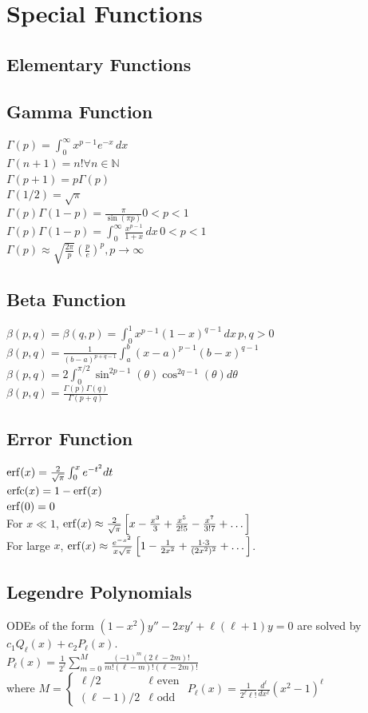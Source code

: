 \documentclass[10pt,landscape,letterpaper]{cheatsheet}
\DeclareMathOperator{\erfc}{erfc}
\begin{document}
\section{Special Functions}
\subsection{Elementary Functions}
\subsection{Gamma Function}
$\Gamma(p)=\int_{0}^{\infty}x^{p-1}e^{-x}\,dx$\\
$\Gamma(n+1)=n!\forall n\in\mathbb{N}$\\
$\Gamma(p+1)=p\Gamma(p)$\\
$\Gamma(1/2)=\sqrt{\pi}$\\
$\Gamma(p)\Gamma(1-p)=\frac{\pi}{\sin(\pi p)}0<p<1$\\
$\Gamma(p)\Gamma(1-p)=\int_{0}^{\infty}\frac{x^{p-1}}{1+x}\,dx\,0<p<1$\\
$\Gamma(p)\approx\sqrt{\frac{2\pi}{p}}\left(\frac{p}{e}\right)^p,p\to\infty$
\subsection{Beta Function}
$\beta(p,q)=\beta(q,p)=\int_{0}^{1}x^{p-1}(1-x)^{q-1}\,dx\,p,q>0$\\
$\beta(p,q)=\frac{1}{({b-a})^{p+q-1}}\int_{a}^{b}(x-a)^{p-1}(b-x)^{q-1}$\\
$\beta(p,q)=2\int_{0}^{\pi/2}\sin^{2p-1}(\theta)\cos^{2q-1}(\theta)d\theta$\\
$\beta(p,q)=\frac{\Gamma(p)\Gamma(q)}{\Gamma(p+q)}$
\subsection{Error Function}
$\erf(x)=\frac{2}{\sqrt{\pi}}\int_{0}^{x}e^{-t^2}dt$\\
$\erfc(x)=1-\erf(x)$\\
$\erf(0)=0$\\
For $x\ll 1$, $\erf(x)\approx \frac{2}{\sqrt{\pi}}\left[x-\frac{x^3}{3}+\frac{x^5}{2!5}-\frac{x^7}{3!7}+\dots\right]$\\
For large $x$,
$\erf(x)\approx\frac{e^{-x^2}}{x\sqrt{\pi}}\left[1-\frac{1}{2x^2}+\frac{1\cdot 3}{(2x^2)^2}+\dots\right]$.
\subsection{Legendre Polynomials}
ODEs of the form 
$(1-x^2)y''-2xy'+\ell(\ell+1)y=0$
are solved by
$c_1Q_\ell(x)+c_2P_\ell(x)$.\\
$P_\ell(x)=\frac{1}{2^\ell}\sum_{m=0}^M\frac{(-1)^m(2\ell-2m)!}{m!(\ell-m)!(\ell-2m)!}$\\
where
$M=\begin{cases}
    \ell/2&\ell\text{ even}\\
    (\ell-1)/2&\ell\text{ odd}
\end{cases}$
$P_\ell(x)=\frac{1}{2^\ell\ell!}\frac{d^\ell}{dx^\ell}\left(x^2-1\right)^\ell$
\end{document}
